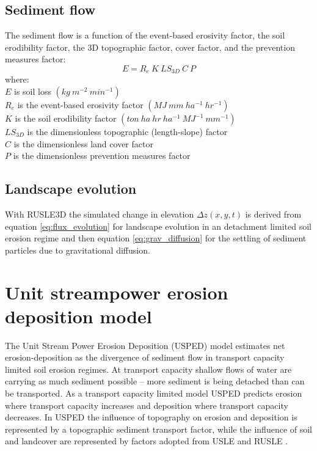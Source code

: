 \documentclass[final,3p,times,twocolumn]{elsarticle}
\begin{document}
\subsection{Sediment flow} 
The sediment flow is a function of the event-based erosivity factor, 
the soil erodibility factor, the 3D topographic factor, cover factor, and the prevention measures factor:
%
\begin{equation}
\label{eq:rusle}
{E = R_e ~ K ~ LS_{3D} ~ C ~ P}
\end{equation}
%
{\small
\noindent
where: \\
\noindent
\hspace*{0.5em} $E$ is soil loss $(kg ~ m^{-2} ~ min^{-1})$\\
\hspace*{0.5em} $R_e$ is the event-based erosivity factor $(MJ ~ mm ~ ha^{-1} ~ hr^{-1})$\\ %
\hspace*{0.5em} $K$ is the soil erodibility factor $(ton ~ ha ~ hr ~ ha^{-1} ~ MJ^{-1} ~ mm^{-1})$\\
\hspace*{0.5em} $LS_{3D}$ is the dimensionless topographic (length-slope) factor\\
\hspace*{0.5em} $C$ is the dimensionless land cover factor\\
\hspace*{0.5em} $P$ is the dimensionless prevention measures factor\\
}

\subsection{Landscape evolution}
With RUSLE3D the simulated change in elevation $\Delta z(x,y,t)$
is derived from 
equation \ref{eq:flux_evolution}
for landscape evolution in an detachment limited soil erosion regime
and then equation \ref{eq:grav_diffusion}
for the settling of sediment particles due to gravitational diffusion.

\section{Unit streampower erosion deposition model} \label{usped_model}
The Unit Stream Power Erosion Deposition (USPED) model 
estimates net erosion-deposition as the divergence of sediment flow
in transport capacity limited soil erosion regimes.
At transport capacity 
shallow flows of water are carrying as much sediment possible 
-- more sediment is being detached 
than can be transported.
As a transport capacity limited model
USPED predicts erosion where transport capacity increases
and deposition where transport capacity decreases. 
In USPED the influence of topography on erosion and deposition
is represented by a topographic sediment transport factor,
while the influence of soil and landcover are represented by 
factors adopted from USLE and RUSLE
\cite{Mitasova1996}.
\end{document}
